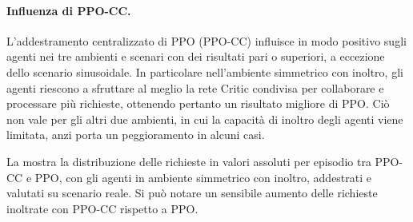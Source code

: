 \paragraph{Influenza di PPO-CC.} L'addestramento centralizzato di PPO (PPO-CC) influisce in modo positivo sugli agenti nei tre ambienti e scenari con dei risultati pari o superiori, a eccezione dello scenario sinusoidale. In particolare nell'ambiente simmetrico con inoltro, gli agenti riescono a sfruttare al meglio la rete Critic condivisa per collaborare e processare più richieste, ottenendo pertanto un risultato migliore di PPO. Ciò non vale per gli altri due ambienti, in cui la capacità di inoltro degli agenti viene limitata, anzi porta un peggioramento in alcuni casi.

La  mostra la distribuzione delle richieste in valori assoluti per episodio tra PPO-CC e PPO, con gli agenti in ambiente simmetrico con inoltro, addestrati e valutati su scenario reale. Si può notare un sensibile aumento delle richieste inoltrate con PPO-CC rispetto a PPO.

